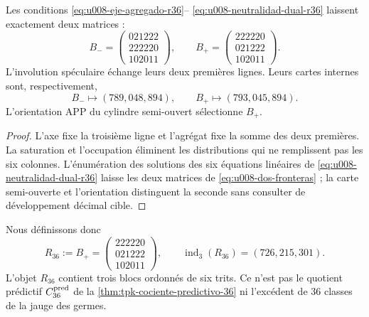\begin{proposition}
\label{prop:u008-enumeracion-r36}
Les conditions \eqref{eq:u008-eje-agregado-r36}--
\eqref{eq:u008-neutralidad-dual-r36} laissent exactement deux matrices :
\begin{equation}
 B_-=
 \begin{pmatrix}021222\\222220\\102011\end{pmatrix},
 \qquad
 B_+=
 \begin{pmatrix}222220\\021222\\102011\end{pmatrix}.
 \label{eq:u008-dos-fronteras}
\end{equation}
L'involution spéculaire échange leurs deux premières lignes. Leurs cartes
internes sont, respectivement,
\begin{equation}
 B_-\longmapsto(789,048,894),
 \qquad
 B_+\longmapsto(793,045,894).
 \label{eq:u008-cartas-frontera}
\end{equation}
L'orientation APP du cylindre semi-ouvert sélectionne \(B_+\).
\end{proposition}

\begin{proof}
L'axe fixe la troisième ligne et l'agrégat fixe la somme des deux premières.
La saturation et l'occupation éliminent les distributions qui ne remplissent pas les
six colonnes. L'énumération des solutions des six équations
linéaires de \eqref{eq:u008-neutralidad-dual-r36} laisse les deux matrices de
\eqref{eq:u008-dos-fronteras} ; la carte semi-ouverte et l'orientation
distinguent la seconde sans consulter de développement décimal cible.
\end{proof}

Nous définissons donc
\begin{equation}
 R_{36}:=B_+=
 \begin{pmatrix}
 222220\\
 021222\\
 102011
 \end{pmatrix},
 \qquad
 \operatorname{ind}_3(R_{36})=(726,215,301).
 \label{eq:u008-r36-construida}
\end{equation}
L'objet \(R_{36}\) contient trois blocs ordonnés de six trits. Ce n'est pas le
quotient prédictif \(C_{36}^{\rm pred}\) de la
\cref{thm:tpk-cociente-predictivo-36} ni l'excédent de 36 classes de la jauge
des germes.

